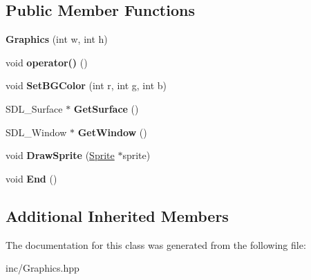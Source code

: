 \subsection*{Public Member Functions}
\begin{DoxyCompactItemize}
\item 
\hypertarget{class_aspen_1_1_graphics_1_1_graphics_a5a579f9b4a32a45a1647e493d0d7f08a}{{\bfseries Graphics} (int w, int h)}\label{class_aspen_1_1_graphics_1_1_graphics_a5a579f9b4a32a45a1647e493d0d7f08a}

\item 
\hypertarget{class_aspen_1_1_graphics_1_1_graphics_aeb2ae0d78a810c9cebb2271b08a13e89}{void {\bfseries operator()} ()}\label{class_aspen_1_1_graphics_1_1_graphics_aeb2ae0d78a810c9cebb2271b08a13e89}

\item 
\hypertarget{class_aspen_1_1_graphics_1_1_graphics_a7cf3a743431f37d570a7e214f9eccf32}{void {\bfseries Set\-B\-G\-Color} (int r, int g, int b)}\label{class_aspen_1_1_graphics_1_1_graphics_a7cf3a743431f37d570a7e214f9eccf32}

\item 
\hypertarget{class_aspen_1_1_graphics_1_1_graphics_a919a726e4960a1e0cc31264cece8acb7}{S\-D\-L\-\_\-\-Surface $\ast$ {\bfseries Get\-Surface} ()}\label{class_aspen_1_1_graphics_1_1_graphics_a919a726e4960a1e0cc31264cece8acb7}

\item 
\hypertarget{class_aspen_1_1_graphics_1_1_graphics_a8d9158217dd776323ad1073bddd90275}{S\-D\-L\-\_\-\-Window $\ast$ {\bfseries Get\-Window} ()}\label{class_aspen_1_1_graphics_1_1_graphics_a8d9158217dd776323ad1073bddd90275}

\item 
\hypertarget{class_aspen_1_1_graphics_1_1_graphics_adca0e0af6e335deccadc1576a7f4d88a}{void {\bfseries Draw\-Sprite} (\hyperlink{class_aspen_1_1_graphics_1_1_sprite}{Sprite} $\ast$sprite)}\label{class_aspen_1_1_graphics_1_1_graphics_adca0e0af6e335deccadc1576a7f4d88a}

\item 
\hypertarget{class_aspen_1_1_graphics_1_1_graphics_aa1c1efd3d5185a65ce78521064ef5b68}{void {\bfseries End} ()}\label{class_aspen_1_1_graphics_1_1_graphics_aa1c1efd3d5185a65ce78521064ef5b68}

\end{DoxyCompactItemize}
\subsection*{Additional Inherited Members}


The documentation for this class was generated from the following file\-:\begin{DoxyCompactItemize}
\item 
inc/Graphics.\-hpp\end{DoxyCompactItemize}
